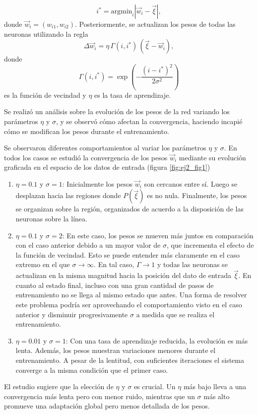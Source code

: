\documentclass[aps,prb,twocolumn,superscriptaddress,floatfix,longbibliography]{revtex4-2}
\newcounter{para}
\begin{document}
\[ i^* = \text{argmin}_i |\vec{w}_i - \vec{\xi}|, \]
donde $\vec{w}_i = (w_{i1}, w_{i2})$. Posteriormente, se actualizan los pesos de todas las neuronas utilizando la regla
\[ \Delta \vec{w}_i = \eta \, \Gamma(i, i^*) \, (\vec{\xi} - \vec{w}_i), \]
donde 
\[ \Gamma(i, i^*) = \exp\left( - \frac{(i - i^*)^2}{2 \sigma^2} \right) \]
es la función de vecindad y \(\eta\) es la tasa de aprendizaje.

Se realizó un análisis sobre la evolución de los pesos de la red variando los parámetros \(\eta\) y \(\sigma\), y se observó cómo afectan la convergencia, haciendo incapié cómo se modifican los pesos durante el entrenamiento.

Se observaron diferentes comportamientos al variar los parámetros \(\eta\) y \(\sigma\). En todos los casos se estudió la convergencia de los pesos $\vec{w}_i$ mediante su evolución graficada en el espacio de los datos de entrada (figura \ref{fig:ej2_fig1})

\begin{enumerate}
    \item \(\eta = 0.1\) y \(\sigma = 1\): Inicialmente los pesos \(\vec{w}_i\) son cercanos entre sí. Luego se desplazan hacia las regiones donde \(P(\vec{\xi})\) es no nula. Finalmente, los pesos se organizan sobre la región, organizados de acuerdo a la disposición de las neuronas sobre la línea.

    \item \(\eta = 0.1\) y \(\sigma = 2\): En este caso, los pesos se mueven más juntos en comparación con el caso anterior debido a un mayor valor de \(\sigma\), que incrementa el efecto de la función de vecindad. Esto se puede entender más claramente en el caso extremo en el que $\sigma \rightarrow \infty$. En tal caso, $\Gamma \rightarrow 1$ y todas las neuronas se actualizan en la misma magnitud hacia la posición del dato de entrada $\vec{\xi}$. En cuanto al estado final, incluso con una gran cantidad de pasos de entrenamiento no se llega al mismo estado que antes. Una forma de resolver este problema podría ser aprovechando el comportamiento visto en el caso anterior y disminuir progresivamente $\sigma$ a medida que se realiza el entrenamiento.
    \item \(\eta = 0.01\) y \(\sigma = 1\): Con una tasa de aprendizaje reducida, la evolución es más lenta. Además, los pesos muestran variaciones menores durante el entrenamiento. A pesar de la lentitud, con suficientes iteraciones el sistema converge a la misma condición que el primer caso.
\end{enumerate}
El estudio sugiere que la elección de \(\eta\) y \(\sigma\) es crucial. Un \(\eta\) más bajo lleva a una convergencia más lenta pero con menor ruido, mientras que un \(\sigma\) más alto promueve una adaptación global pero menos detallada de los pesos. 
\end{document}

